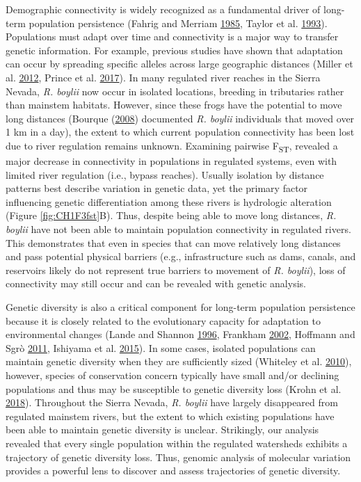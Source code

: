 \documentclass[twoside,12pt,final]{ucthesis-CA2012} %
\begin{document}
\begin{ucmainmatter}
Demographic connectivity is widely recognized as a fundamental driver of
long-term population persistence (Fahrig and Merriam
\protect\hyperlink{ref-fahrig_habitat_1985}{1985}, Taylor et al.
\protect\hyperlink{ref-taylor_connectivity_1993}{1993}). Populations
must adapt over time and connectivity is a major way to transfer genetic
information. For example, previous studies have shown that adaptation
can occur by spreading specific alleles across large geographic
distances (Miller et al.
\protect\hyperlink{ref-miller_conserved_2012}{2012}, Prince et al.
\protect\hyperlink{ref-prince_evolutionary_2017}{2017}). In many
regulated river reaches in the Sierra Nevada, \emph{R. boylii} now occur
in isolated locations, breeding in tributaries rather than mainstem
habitats. However, since these frogs have the potential to move long
distances (Bourque (\protect\hyperlink{ref-bourque_spatial_2008}{2008})
documented \emph{R. boylii} individuals that moved over 1 km in a day),
the extent to which current population connectivity has been lost due to
river regulation remains unknown. Examining pairwise
F\textsubscript{ST}, revealed a major decrease in connectivity in
populations in regulated systems, even with limited river regulation
(i.e., bypass reaches). Usually isolation by distance patterns best
describe variation in genetic data, yet the primary factor influencing
genetic differentiation among these rivers is hydrologic alteration
(Figure \ref{fig:CH1F3fst}B). Thus, despite being able to move long
distances, \emph{R. boylii} have not been able to maintain population
connectivity in regulated rivers. This demonstrates that even in species
that can move relatively long distances and pass potential physical
barriers (e.g., infrastructure such as dams, canals, and reservoirs
likely do not represent true barriers to movement of \emph{R. boylii}),
loss of connectivity may still occur and can be revealed with genetic
analysis.

Genetic diversity is also a critical component for long-term population
persistence because it is closely related to the evolutionary capacity
for adaptation to environmental changes (Lande and Shannon
\protect\hyperlink{ref-lande_role_1996}{1996}, Frankham
\protect\hyperlink{ref-frankham_introduction_2002}{2002}, Hoffmann and
Sgrò \protect\hyperlink{ref-hoffmann_climate_2011}{2011}, Ishiyama et
al. \protect\hyperlink{ref-ishiyama_differential_2015}{2015}). In some
cases, isolated populations can maintain genetic diversity when they are
sufficiently sized (Whiteley et al.
\protect\hyperlink{ref-whiteley_genetic_2010}{2010}), however, species
of conservation concern typically have small and/or declining
populations and thus may be susceptible to genetic diversity loss (Krohn
et al. \protect\hyperlink{ref-krohn_conservation_2018}{2018}).
Throughout the Sierra Nevada, \emph{R. boylii} have largely disappeared
from regulated mainstem rivers, but the extent to which existing
populations have been able to maintain genetic diversity is unclear.
Strikingly, our analysis revealed that every single population within
the regulated watersheds exhibits a trajectory of genetic diversity
loss. Thus, genomic analysis of molecular variation provides a powerful
lens to discover and assess trajectories of genetic diversity.


\end{ucmainmatter}
\end{document}
